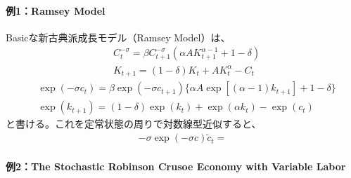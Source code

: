 \documentclass[a4j, dvipdfmx]{jarticle}
\begin{document}
\paragraph{例1：Ramsey Model}
Basicな新古典派成長モデル（Ramsey Model）は、
\begin{align}
&C_t^{-\sigma} = \beta C_{t+1}^{-\sigma} (\alpha A K_{t+1}^{\alpha-1} + 1 -\delta)\\
&K_{t+1} = (1-\delta) K_t + A K_t^\alpha - C_t
\end{align}
\begin{align}
&\exp(-\sigma c_t) = \beta \exp(-\sigma c_{t+1}) \{\alpha A \exp[(\alpha -1) k_{t+1}] + 1 -\delta\}\\
&\exp(k_{t+1}) = (1-\delta) \exp(k_t) + \exp(\alpha k_t) - \exp(c_t)
\end{align}
と書ける。これを定常状態の周りで対数線型近似すると、
\begin{align}
-\sigma \exp(-\sigma c) \tilde c_t = 
\end{align}


\paragraph{例2：The Stochastic Robinson Crusoe Economy with Variable Labor}~
\end{document}
